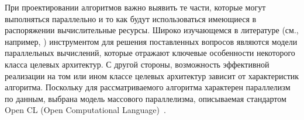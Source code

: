 

При проектировании алгоритмов 
важно выявить те части,
которые могут выполняться параллельно и то как будут использоваться 
имеющиеся в распоряжении вычислительные ресурсы.
Широко изучающемся в литературе
(см., например, \cite{paper_Val_BSP_90, paper_BSPStreaming, paper_Val_multiBSP_08})
инструментом для решения поставленных вопросов являются
модели параллельных вычислений, которые отражают ключевые особенности
некоторого класса целевых архитектур.
С другой стороны, возможность эффективной реализации на том или ином классе
целевых архитектур зависит от характеристик алгоритма.
Поскольку для рассматриваемого алгоритма 
характерен параллелизм по данным, 
выбрана модель массового параллелизма,
описываемая стандартом Open CL
(Open Computational Langua\-ge)~\cite{doc_OCL}.









